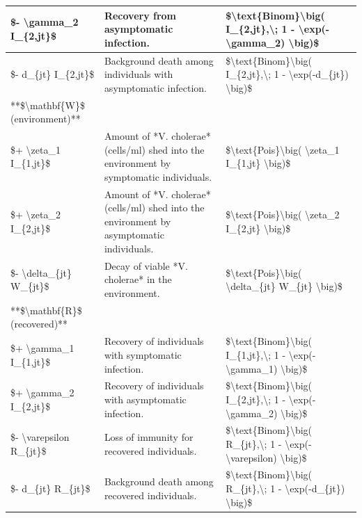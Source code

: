 \documentclass[
]{book}
\begin{document}
\begin{tabular}{l|l|l}
\hline
\$- \textbackslash{}gamma\_2 I\_\{2,jt\}\$ & Recovery from asymptomatic infection. & \$\textbackslash{}text\{Binom\}\textbackslash{}big( I\_\{2,jt\},\textbackslash{}; 1 - \textbackslash{}exp(-\textbackslash{}gamma\_2) \textbackslash{}big)\$\\
\hline
\$- d\_\{jt\} I\_\{2,jt\}\$ & Background death among individuals with asymptomatic infection. & \$\textbackslash{}text\{Binom\}\textbackslash{}big( I\_\{2,jt\},\textbackslash{}; 1 - \textbackslash{}exp(-d\_\{jt\}) \textbackslash{}big)\$\\
\hline
**\$\textbackslash{}mathbf\{W\}\$ (environment)** &  & \\
\hline
\$+ \textbackslash{}zeta\_1 I\_\{1,jt\}\$ & Amount of *V. cholerae* (cells/ml) shed into the environment by symptomatic individuals. & \$\textbackslash{}text\{Pois\}\textbackslash{}big( \textbackslash{}zeta\_1 I\_\{1,jt\} \textbackslash{}big)\$\\
\hline
\$+ \textbackslash{}zeta\_2 I\_\{2,jt\}\$ & Amount of *V. cholerae* (cells/ml) shed into the environment by asymptomatic individuals. & \$\textbackslash{}text\{Pois\}\textbackslash{}big( \textbackslash{}zeta\_2 I\_\{2,jt\} \textbackslash{}big)\$\\
\hline
\$- \textbackslash{}delta\_\{jt\} W\_\{jt\}\$ & Decay of viable *V. cholerae* in the environment. & \$\textbackslash{}text\{Pois\}\textbackslash{}big( \textbackslash{}delta\_\{jt\} W\_\{jt\} \textbackslash{}big)\$\\
\hline
**\$\textbackslash{}mathbf\{R\}\$ (recovered)** &  & \\
\hline
\$+ \textbackslash{}gamma\_1 I\_\{1,jt\}\$ & Recovery of individuals with symptomatic infection. & \$\textbackslash{}text\{Binom\}\textbackslash{}big( I\_\{1,jt\},\textbackslash{}; 1 - \textbackslash{}exp(-\textbackslash{}gamma\_1) \textbackslash{}big)\$\\
\hline
\$+ \textbackslash{}gamma\_2 I\_\{2,jt\}\$ & Recovery of individuals with asymptomatic infection. & \$\textbackslash{}text\{Binom\}\textbackslash{}big( I\_\{2,jt\},\textbackslash{}; 1 - \textbackslash{}exp(-\textbackslash{}gamma\_2) \textbackslash{}big)\$\\
\hline
\$- \textbackslash{}varepsilon R\_\{jt\}\$ & Loss of immunity for recovered individuals. & \$\textbackslash{}text\{Binom\}\textbackslash{}big( R\_\{jt\},\textbackslash{}; 1 - \textbackslash{}exp(-\textbackslash{}varepsilon) \textbackslash{}big)\$\\
\hline
\$- d\_\{jt\} R\_\{jt\}\$ & Background death among recovered individuals. & \$\textbackslash{}text\{Binom\}\textbackslash{}big( R\_\{jt\},\textbackslash{}; 1 - \textbackslash{}exp(-d\_\{jt\}) \textbackslash{}big)\$\\
\hline
\end{tabular}
\end{document}
